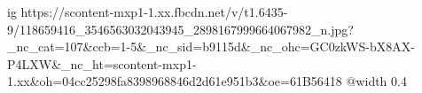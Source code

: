  
 
 
 
 

\ifcmt
  ig https://scontent-mxp1-1.xx.fbcdn.net/v/t1.6435-9/118659416_3546563032043945_2898167999664067982_n.jpg?_nc_cat=107&ccb=1-5&_nc_sid=b9115d&_nc_ohc=GC0zkWS-bX8AX-P4LXW&_nc_ht=scontent-mxp1-1.xx&oh=04cc25298fa8398968846d2d61e951b3&oe=61B56418
  @width 0.4
\fi
